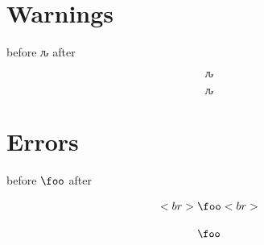 \documentclass{article}
\begin{document}
\section{Warnings}

before $ԉ$ after

$$ԉ$$

\begin{equation}
ԉ
\end{equation}

\section{Errors}

before $\foo$  after

\begin{equation}<br>\foo<br>\end{equation} 

$$\foo$$ 
\end{document}
